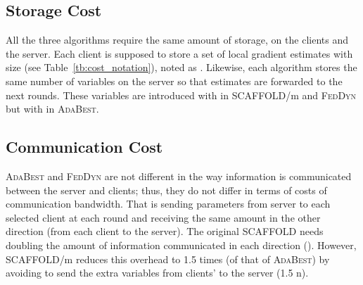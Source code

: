 \documentclass[runningheads]{llncs}
\newcommand{\scaffold}{\textsc{SCAFFOLD}\xspace}
\newcommand{\feddyn}{\textsc{FedDyn}\xspace}
\newcommand{\ours}{\textsc{AdaBest}\xspace}
\begin{document}
\subsection{Storage Cost}
All the three algorithms require the same amount of storage, on the clients and the server. Each client is supposed to store a set of local gradient estimates with size  (see Table~\ref{tb:cost_notation}), noted as . Likewise, each algorithm stores the same number of variables on the server so that estimates are forwarded to the next rounds. These variables are introduced with  in \scaffold/m and \feddyn but with  in \ours. 

\subsection{Communication Cost}
\ours and \feddyn are not different in the way information is communicated between the server and clients; thus, they do not differ in terms of costs of communication bandwidth. That is sending  parameters from server to each selected client at each round and receiving the same amount in the other direction (from each client to the server). The original \scaffold needs doubling the amount of information communicated in each direction (). However, \scaffold/m reduces this overhead to 1.5 times (of that of \ours) by avoiding to send the extra variables from clients' to the server (1.5 n).
\end{document}
